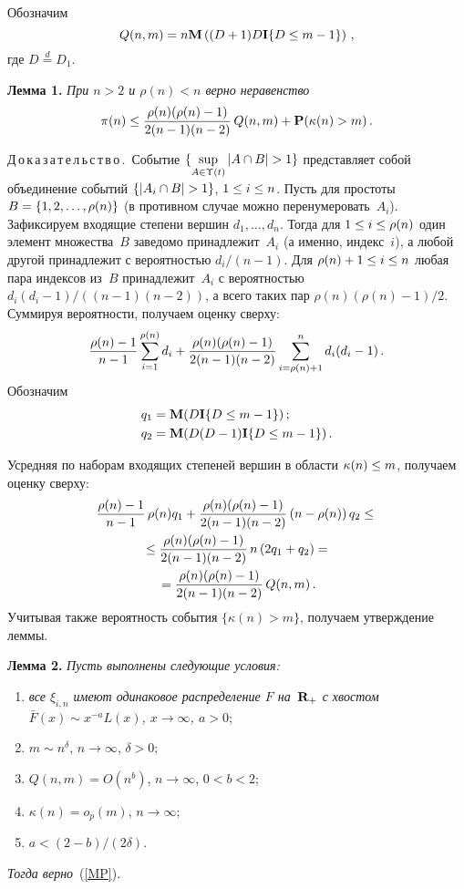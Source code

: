\begin{multicols}{2}
    Обозначим
    $$
    Q(n,m)=n{\bf M}\left((D+1)D{\bf I}\{D\le m-1\}\right)\,,
    $$
    где $D\stackrel{d}{=}D_1$.

\medskip

\noindent
\textbf{Лемма 1.} \textit{При $n>2$ и $\rho(n)<n$ верно неравенство}
    $$
    \pi(n)\le\displaystyle\frac{\displaystyle \rho(n)(\rho(n)-1)\mathstrut}{\displaystyle 2(n-1)(n-2)\mathstrut}\,Q(n,m)+
    {\bf P}(\kappa(n)>m)\,.
    $$

    \smallskip
    
    \noindent
    Д\,о\,к\,а\,з\,а\,т\,е\,л\,ь\,с\,т\,в\,о\,.\
    Событие $\{\sup\limits_{A\in\Upsilon(t)}|A\cap B|\hm>1\}$ представляет собой
    объединение событий $\{|A_i\cap B|\hm>1\}$, $1\hm\le i\hm\le n$.
    Пусть для простоты $B\hm=\{1,2,\dots, \rho(n)\}$ (в противном
    случае можно перенумеровать~$A_i$). Зафиксируем входящие степени
    вершин $d_1,\dots, d_n$. Тогда для $1\hm\le i\hm\le \rho(n)$ один элемент
    множества~$B$ заведомо принадлежит~$A_i$ (а именно, индекс~$i$),
    а любой другой принадлежит с вероятностью $d_i/(n-1)$. Для
    $\rho(n)+1\hm\le i\hm\le n$ любая пара индексов из~$B$ принадлежит~$A_i$
    с ве\-ро\-ят\-ностью $d_i(d_i-1)/((n-1)(n-2))$, а всего таких пар
    $\rho(n)(\rho(n)-1)/2$. Суммируя вероятности, получаем оценку сверху:
    $$
    \displaystyle\frac{\displaystyle \rho(n)-1\mathstrut}{\displaystyle n-1\mathstrut}\sum\limits_{i=1}^{\rho(n)}d_i+
    \displaystyle\frac{\displaystyle \rho(n)(\rho(n)-1)\mathstrut}{\displaystyle 2(n-1)(n-2)\mathstrut}\sum\limits_{i=\rho(n)+1}^nd_i(d_i-1)\,.
    $$
    Обозначим 
    \begin{align*}
    q_1&={\bf M}(D{\bf I}\{D\le m-1\})\,;\\
q_2&={\bf M}(D(D-1){\bf I}\{D\le m-1\})\,.
\end{align*}

Усредняя по наборам входящих
    степеней вершин в области $\kappa(n)\hm\le m$, получаем оценку сверху:
\begin{multline*}
    \displaystyle\frac{\displaystyle \rho(n)-1\mathstrut}{\displaystyle n-1\mathstrut}\,\rho(n)q_1+
    \displaystyle\frac{\displaystyle \rho(n)(\rho(n)-1)\mathstrut}{\displaystyle 2(n-1)(n-2)\mathstrut}\left(n-\rho(n)\right)q_2\le{}\\
{}\le\displaystyle\frac{\displaystyle \rho(n)(\rho(n)-1)\mathstrut}{\displaystyle 2(n-1)(n-2)\mathstrut}\,n\left(2q_1+q_2\right)={}\\
{}=
    \displaystyle\frac{\displaystyle \rho(n)(\rho(n)-1)\mathstrut}{\displaystyle 2(n-1)(n-2)\mathstrut}\,Q(n,m)\,.
\end{multline*}
    Учитывая также вероятность события $\{\kappa(n)>m\}$, получаем
    утверждение леммы.

\medskip

\noindent
\textbf{Лемма 2.} \textit{Пусть выполнены следующие условия:}
\begin{enumerate}[(1)]
\item \textit{все $\xi_{i,n}$ имеют одинаковое распределение $F$ на~${\bf R}_+$
    с хвостом ${\bar F}(x)\sim x^{-a}L(x)$, $x\to\infty$, $a>0$};
\item
    $m\sim n^\delta$, $n\to\infty$, $\delta>0$;
\item
    $Q(n,m)=O(n^b)$, $n\to\infty$,   $0<b<2$;
\item
    $\kappa(n)=o_p(m)$, $n\to\infty$;
\item
    $a<(2-b)/(2\delta)$.
    \end{enumerate}
    \textit{Тогда верно}~(\ref{MP}).


\end{multicols}
